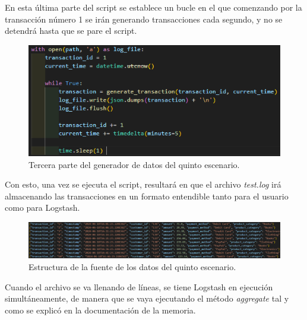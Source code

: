 En esta última parte del script se establece un bucle en el que comenzando por la transacción número 1 se irán generando transacciones cada segundo, y no se detendrá hasta que se pare el script.
\begin{figure}
    \centering
    \includegraphics[width=1\linewidth]{img/escenario53.png}
    \caption{Tercera parte del generador de datos del quinto escenario.}
    \label{fig:generador3}
\end{figure}

Con esto, una vez se ejecuta el script, resultará en que el archivo \textit{test.log} irá almacenando las transacciones en un formato entendible tanto para el usuario como para Logstash.

\begin{figure}
    \centering
    \includegraphics[width=1\linewidth]{img/salida3.png}
    \caption{Estructura de la fuente de los datos del quinto escenario.}
    \label{fig:salida3}
\end{figure}

Cuando el archivo se va llenando de líneas, se tiene Logstash en ejecución simultáneamente, de manera que se vaya ejecutando el método \textit{aggregate} tal y como se explicó en la documentación de la memoria.

\paragraph{}
\paragraph{}
\paragraph{}
